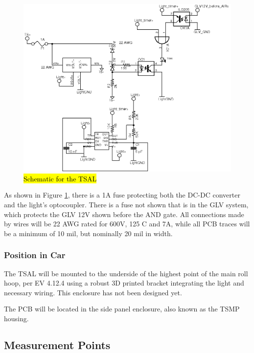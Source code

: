 \documentclass{article}
\DeclareRobustCommand{\hlr}[1]{{\sethlcolor{red}\hl{#1}}}
\begin{document}
            \begin{figure}[H]
            \centering
            \includegraphics[width = 0.7 \textwidth]{TSAL_FSAE}
            \caption{\hlr{Schematic for the TSAL}}
            \label{TSALschem}
            \end{figure}

            As shown in Figure \ref{TSALschem}, there is a 1A fuse protecting both the DC-DC converter and the light's optocoupler. There is a fuse not shown that is in the GLV system, which protects the GLV 12V shown before the AND gate. All connections made by wires will be 22 AWG rated for 600V, 125 \degree C and 7A, while all PCB traces will be a minimum of 10 mil, but nominally 20 mil in width.


        \subsubsection{Position in Car}

            The TSAL will be mounted to the underside of the highest point of the main roll hoop, per EV 4.12.4 using a robust 3D printed bracket integrating the light and necessary wiring. This enclosure has not been designed yet.

            The PCB will be located in the side panel enclosure, also known as the TSMP housing.

    \subsection{Measurement Points}
\end{document}
